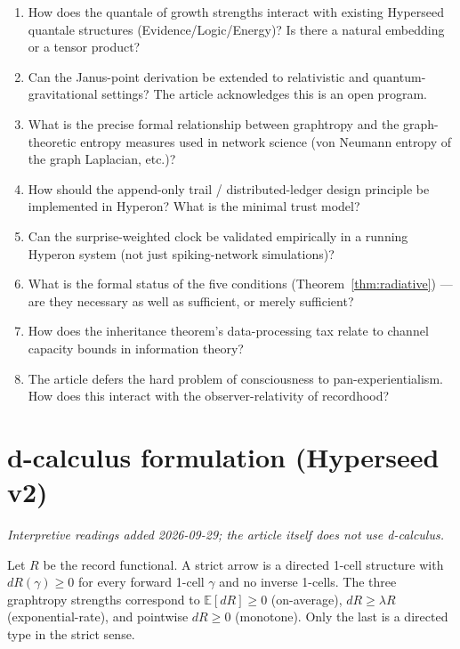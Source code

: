 \documentclass[11pt]{article}
\begin{document}
\begin{enumerate}
  \item How does the quantale of growth strengths interact with existing
    Hyperseed quantale structures (Evidence/Logic/Energy)?  Is there a
    natural embedding or a tensor product?
  \item Can the Janus-point derivation be extended to relativistic and
    quantum-gravitational settings?  The article acknowledges this is an
    open program.
  \item What is the precise formal relationship between graphtropy and the
    graph-theoretic entropy measures used in network science (von Neumann
    entropy of the graph Laplacian, etc.)?
  \item How should the append-only trail / distributed-ledger design
    principle be implemented in Hyperon?  What is the minimal trust model?
  \item Can the surprise-weighted clock be validated empirically in a running
    Hyperon system (not just spiking-network simulations)?
  \item What is the formal status of the five conditions
    (Theorem~\ref{thm:radiative}) — are they necessary as well as
    sufficient, or merely sufficient?
  \item How does the inheritance theorem's data-processing tax relate to
    channel capacity bounds in information theory?
  \item The article defers the hard problem of consciousness to
    pan-experientialism.  How does this interact with the
    observer-relativity of recordhood?
\end{enumerate}


\section{d-calculus formulation (Hyperseed v2)}
\emph{Interpretive readings added 2026-09-29; the article itself does not use d-calculus.}

\begin{proposition}
Let $R$ be the record functional. A strict arrow is a directed 1-cell
structure with $dR(\gamma)\ge 0$ for every forward 1-cell $\gamma$ and no
inverse 1-cells. The three graphtropy strengths correspond to
$\mathbb{E}[dR]\ge 0$ (on-average), $dR\ge\lambda R$ (exponential-rate), and
pointwise $dR\ge 0$ (monotone). Only the last is a directed type in the
strict sense.
\end{proposition}
\end{document}
